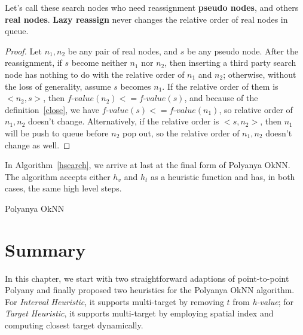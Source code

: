 \begin{lemma}\label{lazy-reassign}
  Let's call these search nodes who need reassignment \textbf{pseudo nodes}, and others
  \textbf{real nodes}. \textbf{Lazy reassign} never changes the relative order of real
  nodes in queue.
\end{lemma}

\begin{proof}
  Let $n_1, n_2$ be any pair of real nodes, and $s$ be any pseudo node.  After the reassignment,
  if $s$ become neither $n_1$ nor $n_2$, then inserting a third party search node has nothing to do with the relative order of $n_1$
  and $n_2$; otherwise, without the loss of generality, assume $s$ becomes $n_1$. If the relative
  order of them is $<n_2, s>$, then $\textit{f-value}(n_2) <= \textit{f-value}(s)$, and
  because of the definition~\ref{close}, we have $\textit{f-value}(s) <= \textit{f-value}(n_1)$, so
  relative order of $n_1, n_2$ doesn't change. Alternatively, if the relative order is $<s, n_2>$,
  then $n_1$  will be push to queue before $n_2$ pop out, so the relative order of $n_1, n_2$ doesn't
  change as well.%
\end{proof}

In Algorithm~\ref{hsearch}, we arrive at last at the final form of Polyanya OkNN. The algorithm
accepts either $h_v$ and $h_t$ as a heuristic function and has, in both cases, the same high level steps.

\begin{algorithm}[!ht]
  
  \caption{Polyanya OkNN}
  \label{hsearch}
\end{algorithm}

\section{Summary}
In this chapter, we start with two straightforward adaptions of point-to-point Polyany
and finally proposed two heuristics for the Polyanya OkNN algorithm.
For \textit{Interval Heuristic}, it supports multi-target by
removing $t$ from \textit{h-value}; for \textit{Target Heuristic}, it supports multi-target by
employing spatial index and computing closest target dynamically.
